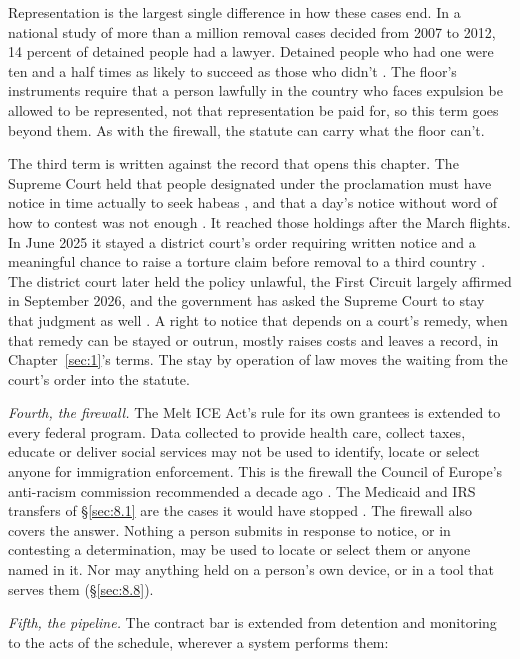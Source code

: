Representation is the largest single difference in how these cases end. In a national study of more than a million removal cases decided from 2007 to 2012, 14 percent of detained people had a lawyer. Detained people who had one were ten and a half times as likely to succeed as those who didn't \autocite{EaglyShafer2016Counsel}. The floor's instruments require that a person lawfully in the country who faces expulsion be allowed to be represented, not that representation be paid for, so this term goes beyond them. As with the firewall, the statute can carry what the floor can't.

The third term is written against the record that opens this chapter. The Supreme Court held that people designated under the proclamation must have notice in time actually to seek habeas \autocite{jgg2025}, and that a day's notice without word of how to contest was not enough \autocite{aarp2025}. It reached those holdings after the March flights. In June 2025 it stayed a district court's order requiring written notice and a meaningful chance to raise a torture claim before removal to a third country \autocite{dvd2025}. The district court later held the policy unlawful, the First Circuit largely affirmed in September 2026, and the government has asked the Supreme Court to stay that judgment as well \autocite{dvd2026application}. A right to notice that depends on a court's remedy, when that remedy can be stayed or outrun, mostly raises costs and leaves a record, in Chapter~\ref{sec:1}'s terms. The stay by operation of law moves the waiting from the court's order into the statute.

\emph{Fourth, the firewall.} The Melt ICE Act's rule for its own grantees is extended to every federal program. Data collected to provide health care, collect taxes, educate or deliver social services may not be used to identify, locate or select anyone for immigration enforcement. This is the firewall the Council of Europe's anti-racism commission recommended a decade ago \autocite{ecri2016gpr16}. The Medicaid and IRS transfers of \S\ref{sec:8.1} are the cases it would have stopped \autocite{JoffeBlock2026MedicaidPalantir,Shaw2026IRSICE}. The firewall also covers the answer. Nothing a person submits in response to notice, or in contesting a determination, may be used to locate or select them or anyone named in it. Nor may anything held on a person's own device, or in a tool that serves them (\S\ref{sec:8.8}).

\emph{Fifth, the pipeline.} The contract bar is extended from detention and monitoring to the acts of the schedule, wherever a system performs them:

